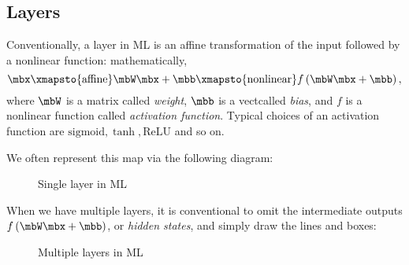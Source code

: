 \documentclass[11pt]{article}
\begin{document}
    \subsection{Layers}

    Conventionally, a layer in ML is an affine transformation of the input followed by a nonlinear function: mathematically,
    \begin{equation}
        \mbx \xmapsto{\text{affine}} \mbW\mbx + \mbb \xmapsto{\text{nonlinear}} f\left( \mbW\mbx + \mbb \right),
    \end{equation}
    where $\mbW$ is a matrix called \textit{weight}, $\mbb$ is a vectcalled \textit{bias}, and $f$ is a nonlinear function called \textit{activation function}. Typical choices of an activation function are $\text{sigmoid},\tanh,\text{ReLU}$ and so on.

    We often represent this map via the following diagram:

    \begin{figure}[H]
        \center
            \begin{center}
            \end{center}
        \caption{Single layer in ML}
    \end{figure}

    \noindent When we have multiple layers, it is conventional to omit the intermediate outputs $f\left( \mbW\mbx+\mbb \right)$, or \textit{hidden states}, and simply draw the lines and boxes:

    \begin{figure}[H]
        \center
            \begin{center}
            \end{center}
        \caption{Multiple layers in ML}
    \end{figure}
\end{document}
